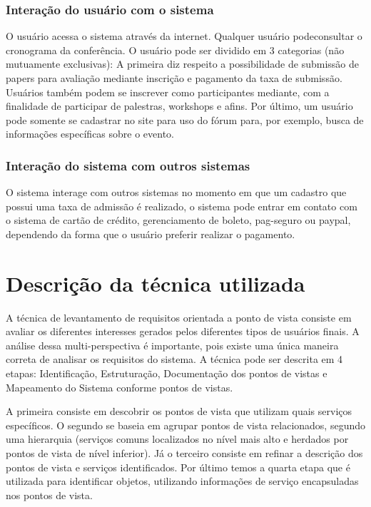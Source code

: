 \documentclass[letter]{article}
\begin{document}
\subsubsection{Interação do usuário com o sistema}
O usuário acessa o sistema através da internet. Qualquer usuário podeconsultar o cronograma da conferência. O usuário pode ser dividido em 3 categorias (não mutuamente exclusivas): A primeira diz respeito a possibilidade de submissão de papers para avaliação mediante inscrição e pagamento da taxa de submissão. Usuários também podem se inscrever como participantes mediante, com a finalidade de participar de palestras, workshops e afins. Por último, um usuário pode somente se cadastrar no site para uso do fórum para, por exemplo, busca de informações específicas sobre o evento.

\subsubsection{Interação do sistema com outros sistemas}

O sistema interage com outros sistemas no momento em que um cadastro que possui uma taxa de admissão é realizado, o sistema pode entrar em contato com o sistema de cartão de crédito, gerenciamento de boleto, pag-seguro ou paypal, dependendo da forma que o usuário preferir realizar o pagamento.



\section{Descrição da técnica utilizada}

A técnica de levantamento de requisitos orientada a ponto de vista consiste em avaliar os diferentes interesses gerados pelos diferentes tipos de usuários finais. A análise dessa multi-perspectiva é importante, pois existe uma única maneira correta de analisar os requisitos do sistema. A técnica pode ser descrita em 4 etapas: Identificação, Estruturação, Documentação dos pontos de vistas e Mapeamento do Sistema conforme pontos de vistas.

A primeira consiste em descobrir os pontos de vista que utilizam quais serviços específicos. O segundo se baseia em agrupar pontos de vista relacionados, segundo uma hierarquia (serviços comuns localizados no nível mais alto e herdados por pontos de vista de nível inferior). Já o terceiro consiste em refinar a descrição dos pontos de vista e serviços identificados. Por último temos a quarta etapa que é utilizada para identificar objetos, utilizando informações de serviço encapsuladas nos pontos de vista.
\end{document}
